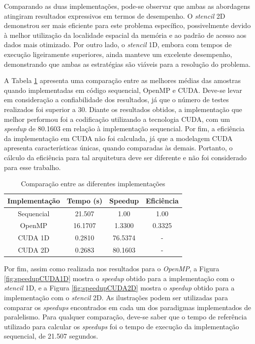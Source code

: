 \documentclass[12pt]{article}
\begin{document}
Comparando as duas implementações, pode-se observar que ambas as abordagens atingiram resultados expressivos em termos de desempenho. O \emph{stencil} 2D demonstrou ser mais eficiente para este problema específico, possivelmente devido à melhor utilização da localidade espacial da memória e ao padrão de acesso aos dados mais otimizado. Por outro lado, o \emph{stencil} 1D, embora com tempos de execução ligeiramente superiores, ainda manteve um excelente desempenho, demonstrando que ambas as estratégias são viáveis para a resolução do problema.

A Tabela \ref{tab:comparacao_implementacoes} apresenta uma comparação entre as melhores médias das amostras quando implementadas em código sequencial, OpenMP e CUDA. Deve-se levar em consideração a confiabilidade dos resultados, já que o número de testes realizados foi superior a 30. Diante os resultados obtidos, a implementação que melhor performou foi a codificação utilizando a tecnologia CUDA, com um \emph{speedup} de 80.1603 em relação à implementação sequencial. Por fim, a eficiência da implementação em CUDA não foi calculada, já que a modelagem CUDA apresenta características únicas, quando comparadas às demais. Portanto, o cálculo da eficiência para tal arquitetura deve ser diferente e não foi considerado para esse trabalho. 

\begin{table}[ht]
    \centering
    \caption{Comparação entre as diferentes implementações}
    \begin{tabular}{|c|c|c|c|}
        \hline
        \textbf{Implementação} & \textbf{Tempo (s)} & \textbf{Speedup} & \textbf{Eficiência} \\
        \hline
        Sequencial & 21.507 & 1.00 & 1.00 \\
        \hline
        OpenMP & 16.1707 & 1.3300 & 0.3325 \\
        \hline
        CUDA 1D & 0.2810 & 76.5374 & - \\
        \hline
        CUDA 2D & 0.2683 & 80.1603 & - \\
        \hline
    \end{tabular}
    \label{tab:comparacao_implementacoes}
\end{table}

Por fim, assim como realizada nos resultados para o \emph{OpenMP}, a Figura \ref{fig:speedupCUDA1D} mostra o \emph{speedup} obtido para a implementação com o \emph{stencil} 1D, e a Figura \ref{fig:speedupCUDA2D} mostra o \emph{speedup} obtido para a implementação com o \emph{stencil} 2D. As ilustrações podem ser utilizadas para comparar os \emph{speedups} encontrados em cada um dos paradigmas implementados de paralelismo. Para qualquer comparação, deve-se saber que o tempo de referência utilizado para calcular os \emph{speedups} foi o tempo de execução da implementação sequencial, de 21.507 segundos.
\end{document}
